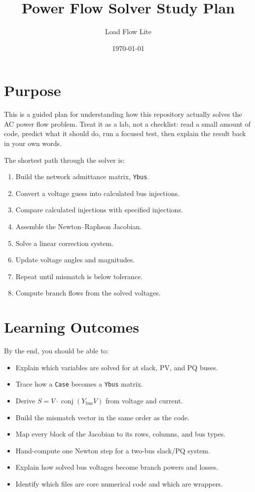 \documentclass[11pt]{article}
\title{Power Flow Solver Study Plan}
\author{Load Flow Lite}
\date{\today}
\newcommand{\code}[1]{\texttt{#1}}
\begin{document}
\maketitle
\tableofcontents
\newpage

\section{Purpose}

This is a guided plan for understanding how this repository actually solves the
AC power flow problem. Treat it as a lab, not a checklist: read a small amount
of code, predict what it should do, run a focused test, then explain the result
back in your own words.

The shortest path through the solver is:

\begin{enumerate}
  \item Build the network admittance matrix, \code{Ybus}.
  \item Convert a voltage guess into calculated bus injections.
  \item Compare calculated injections with specified injections.
  \item Assemble the Newton--Raphson Jacobian.
  \item Solve a linear correction system.
  \item Update voltage angles and magnitudes.
  \item Repeat until mismatch is below tolerance.
  \item Compute branch flows from the solved voltages.
\end{enumerate}

\section{Learning Outcomes}

By the end, you should be able to:

\begin{itemize}
  \item Explain which variables are solved for at slack, PV, and PQ buses.
  \item Trace how a \code{Case} becomes a \code{Ybus} matrix.
  \item Derive $S = V \cdot \operatorname{conj}(Y_{\mathrm{bus}} V)$ from
  voltage and current.
  \item Build the mismatch vector in the same order as the code.
  \item Map every block of the Jacobian to its rows, columns, and bus types.
  \item Hand-compute one Newton step for a two-bus slack/PQ system.
  \item Explain how solved bus voltages become branch powers and losses.
  \item Identify which files are core numerical code and which are wrappers.
\end{itemize}
\end{document}
